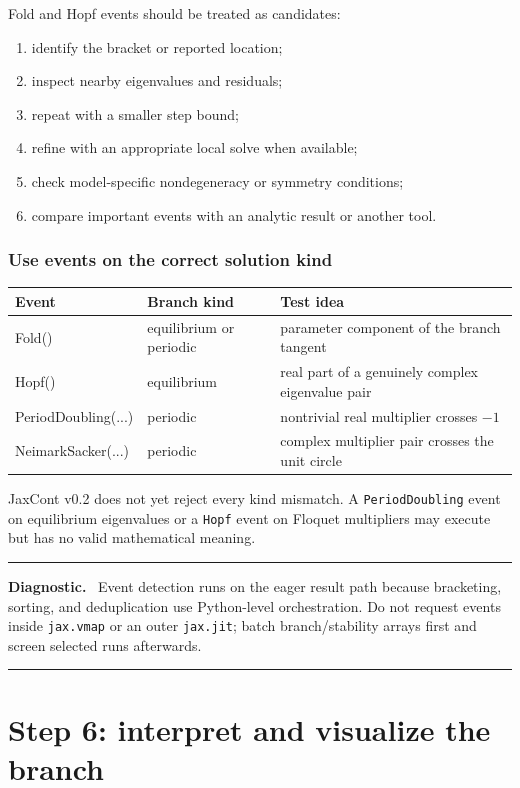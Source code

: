 \documentclass[11pt,oneside]{book}
\newenvironment{diagnosticbox}
  {\par\medskip\noindent\begin{minipage}{\textwidth}
   \color{JaxOrange!90!black}\rule{\textwidth}{0.8pt}\par
   \textbf{Diagnostic.}\ \color{black}}
  {\par\color{JaxOrange!90!black}\rule{\textwidth}{0.8pt}
   \end{minipage}\par\medskip}
\begin{document}
Fold and Hopf events should be treated as candidates:

\begin{enumerate}
  \item identify the bracket or reported location;
  \item inspect nearby eigenvalues and residuals;
  \item repeat with a smaller step bound;
  \item refine with an appropriate local solve when available;
  \item check model-specific nondegeneracy or symmetry conditions;
  \item compare important events with an analytic result or another tool.
\end{enumerate}

\subsection{Use events on the correct solution kind}

\begin{tabularx}{\textwidth}{>{\ttfamily}p{}p{}X}
\toprule
\normalfont Event & Branch kind & Test idea\\
\midrule
Fold() & equilibrium or periodic & parameter component of the branch tangent\\
Hopf() & equilibrium & real part of a genuinely complex eigenvalue pair\\
PeriodDoubling(...) & periodic & nontrivial real multiplier crosses $-1$\\
NeimarkSacker(...) & periodic & complex multiplier pair crosses the unit circle\\
\bottomrule
\end{tabularx}

JaxCont v0.2 does not yet reject every kind mismatch. A
\texttt{PeriodDoubling} event on equilibrium eigenvalues or a \texttt{Hopf}
event on Floquet multipliers may execute but has no valid mathematical meaning.

\begin{diagnosticbox}
Event detection runs on the eager result path because bracketing, sorting, and
deduplication use Python-level orchestration. Do not request events inside
\texttt{jax.vmap} or an outer \texttt{jax.jit}; batch branch/stability arrays
first and screen selected runs afterwards.
\end{diagnosticbox}

\chapter{Step 6: interpret and visualize the branch}
\end{document}
